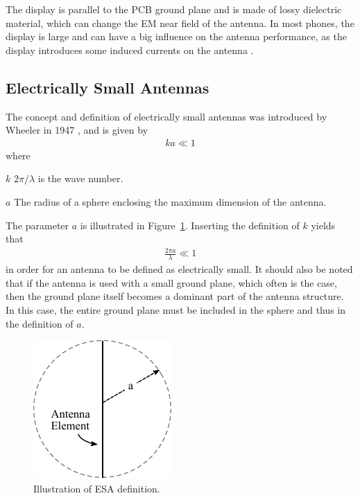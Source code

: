 The display is parallel to the PCB ground plane and is made of lossy dielectric material, which can change the EM near field of the antenna. In most phones, the display is large and can have a big influence on the antenna performance, as the display introduces some induced currents on the antenna \cite{fujimoto2008mobile}.   

\subsection{Electrically Small Antennas}
\label{sec:elsmallantennas}
The concept and definition of electrically small antennas was introduced by Wheeler in 1947 \cite{wheeler1947}, and is given by
\begin{align} %
\label{eq:esa-def}
  ka \ll 1
\end{align}
where 
\begin{where}
\item[$k$] $2\pi / \lambda$ is the wave number. 
\item[$a$] The radius of a sphere enclosing the maximum dimension of the antenna. 
\end{where}
The parameter $a$ is illustrated in Figure~\ref{fig:ant-esa-def}. Inserting the definition of $k$ yields that
\begin{align} %
  \frac{2\pi a}{\lambda} \ll 1
\end{align}
in order for an antenna to be defined as electrically small. It should also be noted that if the antenna is used with a small ground plane, which often is the case, then the ground plane itself becomes a dominant part of the antenna structure. In this case, the entire ground plane must be included in the sphere and thus in the definition of $a$.

\begin{figure}[htbp]
  \centering
  \includegraphics[scale=1]{img/analysis/ESA}
  \caption{Illustration of ESA definition.}
  \label{fig:ant-esa-def}
\end{figure}

